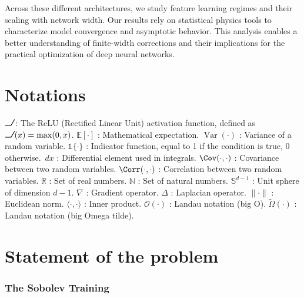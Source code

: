 \documentclass[a4paper]{article}
\DeclareRobustCommand{\ReLU}{\mathrel{\text{%
    \begin{tikzpicture}[baseline=(current bounding box.south)]
        \draw[thick] (0,0) -- (0.25,0) -- (0.4,0.25);
    \end{tikzpicture}}}\!\!}
\newcommand{\E}{\mathbb{E}}
\DeclareMathOperator{\Var}{Var}
\newcommand{\indic}{\mathbb{1}}
\newcommand{\dd}{\,d}
\begin{document}
Across these different architectures, we study feature learning regimes and their scaling with network width. Our results rely on statistical physics tools to characterize model convergence and asymptotic behavior. This analysis enables a better understanding of finite-width corrections and their implications for the practical optimization of deep neural networks.


\newpage
{}
\section*{Notations}
$\ReLU$ : The ReLU (Rectified Linear Unit) activation function, defined as $\ReLU(x) = \max(0, x)$.
\newline
$\E[\cdot]$ : Mathematical expectation.
\newline
$\Var(\cdot)$ : Variance of a random variable.
\newline
$\indic\{\cdot\}$ : Indicator function, equal to 1 if the condition is true, 0 otherwise.
\newline
$\dd x$ : Differential element used in integrals.
\newline
$\Cov(\cdot,\cdot)$ : Covariance between two random variables.
\newline
$\Corr(\cdot,\cdot)$ : Correlation between two random variables.
\newline
$\mathbb{R}$ : Set of real numbers.
\newline
$\mathbb{N}$ : Set of natural numbers.
\newline
$\mathbb{S}^{d-1}$ : Unit sphere of dimension $d-1$.
\newline
$\nabla$ : Gradient operator.
\newline
$\Delta$ : Laplacian operator.
\newline
$\|\cdot\|$ : Euclidean norm.
\newline
$\langle \cdot,\cdot \rangle$ : Inner product.
\newline
$\mathcal{O}(\cdot)$ : Landau notation (big O).
\newline
$\tilde{\Omega}(\cdot)$ : Landau notation (big Omega tilde).

\newpage


\section{Statement of the problem}

\subsubsection{The Sobolev Training}
\end{document}

